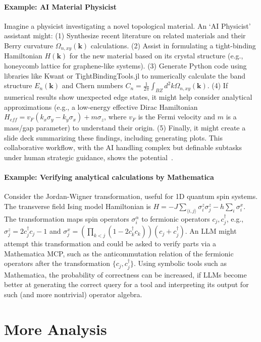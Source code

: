 \paragraph{Example: AI Material Physicist}
Imagine a physicist investigating a novel topological material. An `AI Physicist' assistant might: (1) Synthesize recent literature on related materials and their Berry curvature $\Omega_{n,xy}(\mathbf{k})$ calculations. (2) Assist in formulating a tight-binding Hamiltonian $H(\mathbf{k})$ for the new material based on its crystal structure (e.g., honeycomb lattice for graphene-like systems). (3) Generate Python code using libraries like Kwant or TightBindingTools.jl to numerically calculate the band structure $E_n(\mathbf{k})$ and Chern numbers $C_n = \frac{1}{2\pi} \int_{BZ} d^2k \Omega_{n,xy}(\mathbf{k})$. (4) If numerical results show unexpected edge states, it might help consider analytical approximations (e.g., a low-energy effective Dirac Hamiltonian $H_{eff} = v_F (k_x \sigma_y - k_y \sigma_x) + m \sigma_z$, where $v_F$ is the Fermi velocity and $m$ is a mass/gap parameter) to understand their origin. (5) Finally, it might create a slide deck summarizing these findings, including generating plots. This collaborative workflow, with the AI handling complex but definable subtasks under human strategic guidance, shows the potential~\cite{Wang2023Scientific}.

\paragraph{Example: Verifying analytical calculations by Mathematica}
Consider the Jordan-Wigner transformation, useful for 1D quantum spin systems. The transverse field Ising model Hamiltonian is $H = -J \sum_{\langle i,j \rangle} \sigma_i^z \sigma_j^z - h \sum_i \sigma_i^x$. The transformation maps spin operators $\sigma_i^\alpha$ to fermionic operators $c_j, c_j^\dagger$, e.g., $\sigma_j^z = 2c_j^\dagger c_j - 1$ and $\sigma_j^x = (\prod_{k<j} (1-2c_k^\dagger c_k)) (c_j + c_j^\dagger)$. An LLM might attempt this transformation and could be asked to verify parts via a Mathematica MCP, such as the anticommutation relation of the fermionic operators after the transformation $\{c_j, c_j^\dagger\}$. Using symbolic tools such as Mathematica, the probability of correctness can be increased, if LLMs become better at generating the correct query for a tool and interpreting its output for such (and more nontrivial) operator algebra.


\section{More Analysis}

